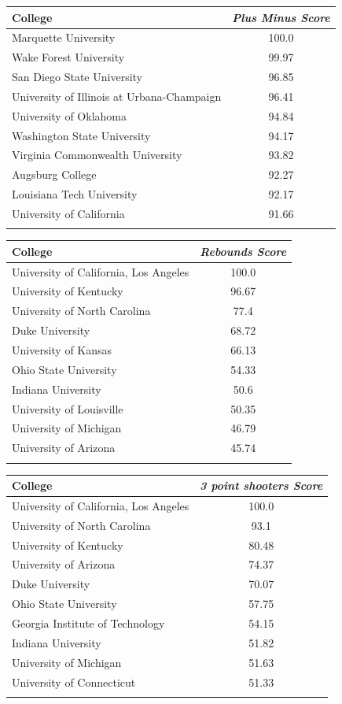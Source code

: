 \documentclass[10.5pt,a4paper,twocolumn]{article}
\begin{document}
\begin{table}[t]
	\begin{tabular}{lc}
		College & \textit{Plus Minus Score}  \\
		\hline
		Marquette University & 100.0\\
		Wake Forest University & 99.97\\
		San Diego State University & 96.85\\
		University of Illinois at Urbana-Champaign & 96.41\\
		University of Oklahoma & 94.84\\
		Washington State University & 94.17\\
		Virginia Commonwealth University & 93.82\\
		Augsburg College & 92.27\\
		Louisiana Tech University & 92.17\\
		University of California & 91.66\\
		&\\
	\end{tabular}
	
	\begin{tabular}{lc}
		College & \textit{Rebounds Score}  \\
		\hline
		University of California, Los Angeles & 100.0\\
		University of Kentucky & 96.67\\
		University of North Carolina & 77.4\\
		Duke University & 68.72\\
		University of Kansas & 66.13\\
		Ohio State University & 54.33\\
		Indiana University & 50.6\\
		University of Louisville & 50.35\\
		University of Michigan & 46.79\\
		University of Arizona & 45.74\\
		&\\
		
	\end{tabular}
	
	\begin{tabular}{lc}
		College & \textit{3 point shooters Score}  \\
		\hline
		University of California, Los Angeles & 100.0\\
		University of North Carolina & 93.1\\
		University of Kentucky & 80.48\\
		University of Arizona & 74.37\\
		Duke University & 70.07\\
		Ohio State University & 57.75\\
		Georgia Institute of Technology & 54.15\\
		Indiana University & 51.82\\
		University of Michigan & 51.63\\
		University of Connecticut & 51.33\\
		&\\
		

\end{tabular}
\end{table}
\end{document}
